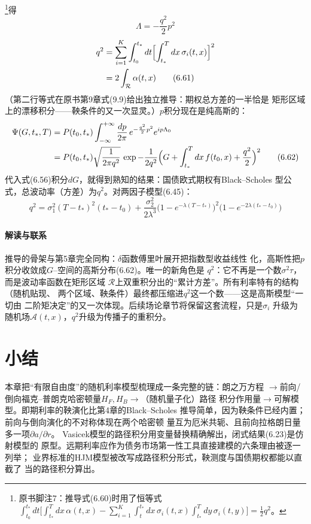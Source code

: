 \footnote{原书脚注7：推导式(6.60)时用了恒等式
$\int_{t_0}^{t_*}dt\bigl[\int_{t_*}^{T}dx\,\alpha(t,x)
-\sum_{i=1}^{K}\int_{t}^{t_*}dx\,\sigma_i(t,x)\int_{t_*}^{T}dy\,
\sigma_i(t,y)\bigr]=\frac{1}{2}q^2$。}得
\begin{equation*}
\Lambda=-\frac{q^2}{2}p^2
\tag{6.60}
\end{equation*}
\begin{align*}
q^2&=\sum_{i=1}^{K}\int_{t_0}^{t_*}dt\Bigl[\int_{t_*}^{T}dx\,
\sigma_i(t,x)\Bigr]^2\\
&=2\int_{\mathcal{R}}\alpha(t,x)
\tag{6.61}
\end{align*}
（第二行等式在原书第9章式(9.9)给出独立推导：期权总方差的一半恰是
矩形区域上的漂移积分——鞅条件的又一次显灵。）$p$积分现在是纯高斯的：
\begin{align*}
\Psi(G,t_*,T)&=P(t_0,t_*)\int_{-\infty}^{+\infty}\frac{dp}{2\pi}\,
e^{-\frac{q^2}{2}p^2}e^{ip\Lambda_0}\\
&=P(t_0,t_*)\sqrt{\frac{1}{2\pi q^2}}\,
\exp-\frac{1}{2q^2}\Bigl(G+\int_{t_*}^{T}dx\,f(t_0,x)
+\frac{q^2}{2}\Bigr)^2
\tag{6.62}
\end{align*}
代入式(6.56)积分$dG$，就得到熟知的结果：国债欧式期权有Black--Scholes
型公式，总波动率（方差）为$q^2$。对两因子模型(6.45)：
\begin{equation*}
q^2=\sigma_1^2(T-t_*)^2(t_*-t_0)
+\frac{\sigma_2^2}{2\lambda^3}
\bigl(1-e^{-\lambda(T-t_*)}\bigr)^2
\bigl(1-e^{-2\lambda(t_*-t_0)}\bigr)
\tag{6.63}
\end{equation*}

\paragraph{解读与联系}
推导的骨架与第5章完全同构：$\delta$函数傅里叶展开把指数型收益线性
化，高斯性把$p$积分收敛成$G$--空间的高斯分布(6.62)。唯一的新角色是
$q^2$：它不再是一个数$\sigma^2\tau$，而是波动率函数在矩形区域
$\mathcal{R}$上双重积分出的“累计方差”。所有利率特有的结构（随机贴现、
两个区域、鞅条件）最终都压缩进$q^2$这一个数——这是高斯模型“一切由
二阶矩决定”的又一次体现。后续场论章节将保留这套流程，只是$\sigma_i$
升级为随机场$\mathcal{A}(t,x)$，$q^2$升级为传播子的重积分。

\section{小结}

本章把“有限自由度”的随机利率模型梳理成一条完整的链：朗之万方程
$\to$前向/倒向福克--普朗克哈密顿量$H_F,H_B\to$（随机量子化）路径
积分作用量$\to$可解模型。即期利率的鞅演化比第4章的Black--Scholes
推导简单，因为鞅条件已经内置；前向与倒向演化的不对称体现在两个哈密顿
量互为厄米共轭、且前向拉格朗日量多一项$\partial a/\partial r$。
Vasicek模型的路径积分用变量替换精确解出，闭式结果(6.23)是仿射模型的
原型。远期利率应作为债务市场第一性工具直接建模的六条理由被逐一列举；
业界标准的HJM模型被改写成路径积分形式，鞅测度与国债期权都能以直截了
当的路径积分算出。

